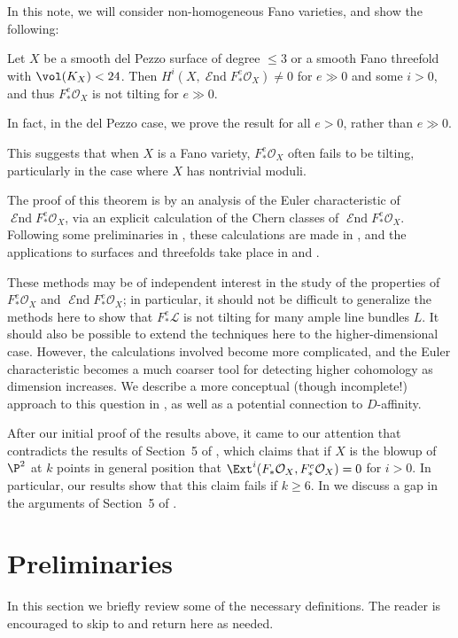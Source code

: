 \documentclass{article}
\def\O{\mathcal O}
\numberwithin{equation}{section}
\theoremstyle{theorem}
\numberwithin{thm}{section}
\theoremstyle{definition}
\def\L{\mathcal L}
\DeclareMathOperator{\SEnd}{\mathcal{E}nd}
\begin{document}
In this note, we will consider non-homogeneous Fano varieties, and show the following:

\begin{thm}
Let $X$ be a smooth del Pezzo surface of degree $\leq 3$ or a smooth Fano threefold with $\vol(K_X)< 24$. Then $H^i(X,\SEnd F_*^e\O_X)\neq 0$ for $e\gg 0$ and some $i>0$, and thus $F_*^e \O_X$ is not tilting for $e\gg0$.
\end{thm}

In fact, in the del Pezzo case, we prove the result for all $e>0$, rather than $e\gg0$.

This suggests that when $X$ is a Fano variety, $F_*^e\O_X$ often fails to be tilting, particularly in the case where $X$ has nontrivial moduli.

The proof of this theorem is by an analysis of the Euler characteristic of $\SEnd F_*^e\O_X$, via an explicit calculation of the Chern classes of $\SEnd F_*^e\O_X$. 
Following some preliminaries in , these calculations are made in , and the applications to surfaces and threefolds take place in  and .

 These methods may be of independent interest in the study of the properties of $F_*^e\O_X$ and $\SEnd F_*^e\O_X$; in particular, it should not be difficult to generalize the methods here to show that $F_*^e\L$ is not tilting for many ample line bundles $L$. It should also be possible to extend the techniques here to the higher-dimensional case. However, the calculations involved become more complicated, and the Euler characteristic becomes a much coarser tool for detecting higher cohomology as dimension increases. We describe a more conceptual (though incomplete!) approach to this question in , as well as a potential connection to $D$-affinity.


\begin{rem}
After our initial proof of the results above, it came to our attention that
 contradicts the results of 
Section~5 of \cite{samokhin}, which claims that if $X$ is the blowup of $\P^2$ at $k$ points in general position that $\Ext^i(F_*\O_X,F_*^e\O_X)=0$ for $i>0$. In particular, our results show that this claim fails if $k\geq 6$. In  we discuss a gap in the arguments of Section~5 of \cite{samokhin}.
\end{rem}



\section{Preliminaries}
\label{prelim}
In this section we briefly review some of the necessary definitions. The reader is encouraged to skip to  and return here as needed.
\end{document}
